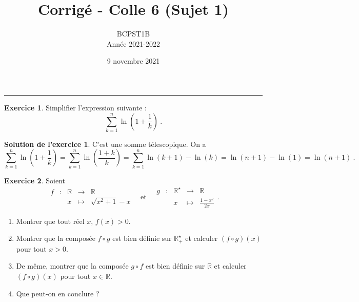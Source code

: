 \documentclass[a4paper, 11pt,openany]{article}%
\title{Corrigé - Colle 6 (Sujet 1)}
\author{BCPST1B\\
Année 2021-2022}
\date{9 novembre 2021}
\theoremstyle{plain}
\theoremstyle{definition}
\newtheorem{exo}{Exercice}
\newtheorem{sol}{Solution de l'exercice}
\theoremstyle{remark}
\newcommand{\R}{\mathbb{R}}
\begin{document}
   \maketitle
      \rule{\linewidth}{0.5mm}


\begin{exo}
	Simplifier l'expression suivante :
	\[
		\sum_{k=1}^n \ln\left(1+ \frac{1}{k}\right) \ .
	\]
\end{exo}

\begin{sol}
C'est une somme télescopique. On a
	\[
		\sum_{k=1}^n \ln\left(1+ \frac{1}{k}\right) = \sum_{k=1}^n \ln\left( \frac{1+k}{k}\right) = \sum_{k=1}^n \ln\left(k+1\right) - \ln(k) = \ln(n+1) - \ln(1) = \ln(n+1) \ .
	\]
\end{sol}

   

\begin{exo}
Soient
\[  \begin{array}{ccccc}
f & : & \R & \to & \R \\
 & & x & \mapsto & \sqrt{x^2+1} - x
\end{array} \quad \text{et} \quad \begin{array}{ccccc}
g & : & \R^{\star} & \to & \R \\
 & & x& \mapsto & \frac{1-x^2}{2x}
\end{array}.\]
\begin{enumerate}
\item Montrer que tout réel $x$, $f(x) > 0$.
\item Montrer que la composée $f \circ g$ est bien définie sur $\R_+^{\star}$ et calculer $(f \circ g)(x)$ pour tout $x > 0$.
\item De même, montrer que la composée $g \circ f$ est bien définie sur $\R$ et calculer $(f \circ g)(x)$ pour tout $x \in \R$.
\item Que peut-on en conclure ?
\end{enumerate}
\end{exo}
\end{document}
